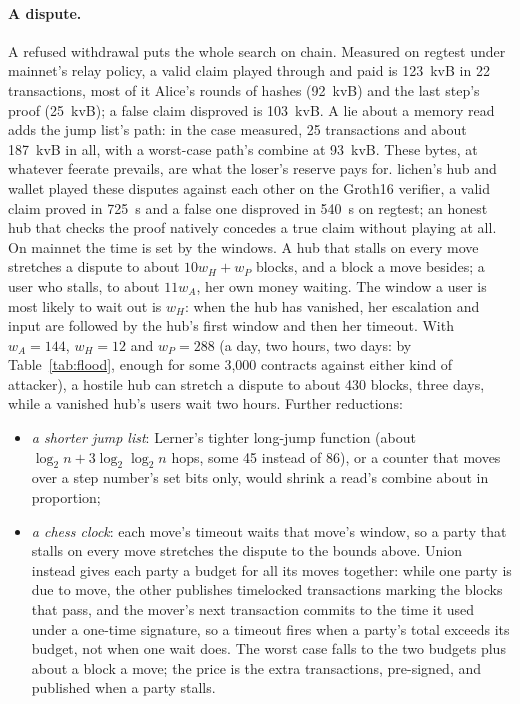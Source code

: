 \documentclass[11pt]{article}
\begin{document}
\paragraph{A dispute.} A refused withdrawal puts the whole search on
chain. Measured on regtest under mainnet's relay policy, a valid claim
played through and paid is 123~kvB in 22 transactions, most of it
Alice's rounds of hashes (92~kvB) and the last step's proof (25~kvB); a
false claim disproved is 103~kvB. A lie about a memory read adds the
jump list's path: in the case measured, 25 transactions and about
187~kvB in all, with a worst-case path's combine at 93~kvB. These
bytes, at whatever feerate prevails, are what the loser's reserve pays
for. lichen's hub and wallet played these disputes against each other
on the Groth16 verifier, a valid claim proved in 725~s and a false one
disproved in 540~s on regtest; an honest hub that checks the proof
natively concedes a true claim without playing at all. On mainnet the
time is set by the windows. A hub that stalls on every move stretches a
dispute to about $10 w_H + w_P$ blocks, and a block a move besides; a
user who stalls, to about $11 w_A$, her own money waiting. The window a
user is most likely to wait out is $w_H$: when the hub has vanished, her
escalation and input are followed by the hub's first window and then her
timeout. With $w_A = 144$, $w_H = 12$ and $w_P = 288$ (a day, two hours,
two days: by Table~\ref{tab:flood}, enough for some 3,000 contracts
against either kind of attacker), a hostile hub can stretch a dispute to
about 430 blocks, three days, while a vanished hub's users wait two
hours.
Further reductions:
\begin{itemize}[leftmargin=1.5em]
\item \emph{a shorter jump list}: Lerner's tighter long-jump function
  (about $\log_2 n + 3\log_2\log_2 n$ hops, some 45 instead of 86), or a
  counter that moves over a step number's set bits only, would shrink a
  read's combine about in proportion;
\item \emph{a chess clock}: each move's timeout waits that move's
  window, so a party that stalls on every move stretches the dispute to
  the bounds above. Union~\cite{union} instead gives each
  party a budget for all its moves together: while one party is due to
  move, the other publishes timelocked transactions marking the blocks
  that pass, and the mover's next transaction commits to the time it
  used under a one-time signature, so a timeout fires when a party's
  total exceeds its budget, not when one wait does. The worst case falls
  to the two budgets plus about a block a move; the price is the extra
  transactions, pre-signed, and published when a party stalls.
\end{itemize}
\end{document}
